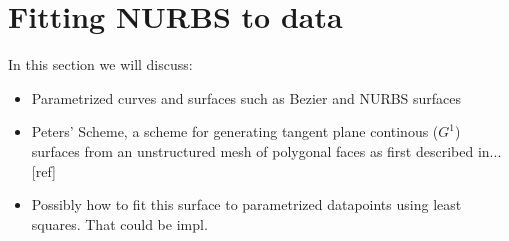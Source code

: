 \section{Fitting \acs{NURBS} to data}
\label{sec:NURBS}

In this section we will discuss:
\begin{itemize}
\item Parametrized curves and surfaces such as Bezier and NURBS surfaces
\item Peters' Scheme, a scheme for generating tangent plane continous ($G^1$) surfaces from an unstructured mesh of polygonal faces as first described in...[ref]
\item Possibly how to fit this surface to parametrized datapoints using least squares. That could be impl.
\end{itemize}



